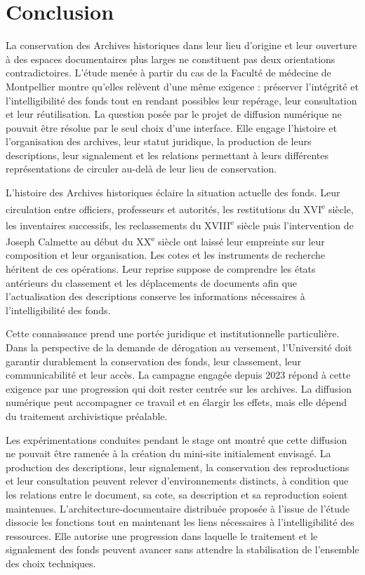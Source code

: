 
\chapter*{Conclusion}

La conservation des Archives historiques dans leur lieu d'origine et leur ouverture à des espaces documentaires plus larges ne constituent pas deux orientations contradictoires. L'étude menée à partir du cas de la Faculté de médecine de Montpellier montre qu'elles relèvent d'une même exigence : préserver l'intégrité et l'intelligibilité des fonds tout en rendant possibles leur repérage, leur consultation et leur réutilisation. La question posée par le projet de diffusion numérique ne pouvait être résolue par le seul choix d'une interface. Elle engage l'histoire et l'organisation des archives, leur statut juridique, la production de leurs descriptions, leur \gls{signalement} et les relations permettant à leurs différentes représentations de circuler au-delà de leur lieu de conservation.

L'histoire des Archives historiques éclaire la situation actuelle des fonds. Leur circulation entre officiers, professeurs et autorités, les restitutions du XVI\textsuperscript{e} siècle, les inventaires successifs, les reclassements du XVIII\textsuperscript{e} siècle puis l'intervention de Joseph Calmette au début du XX\textsuperscript{e} siècle ont laissé leur empreinte sur leur composition et leur organisation. Les cotes et les instruments de recherche héritent de ces opérations. Leur reprise suppose de comprendre les états antérieurs du classement et les déplacements de documents afin que l'actualisation des descriptions conserve les informations nécessaires à l'intelligibilité des fonds.

Cette connaissance prend une portée juridique et institutionnelle particulière. Dans la perspective de la demande de dérogation au versement, l'Université doit garantir durablement la conservation des fonds, leur classement, leur communicabilité et leur accès. La campagne engagée depuis 2023 répond à cette exigence par une progression qui doit rester centrée sur les archives. La diffusion numérique peut accompagner ce travail et en élargir les effets, mais elle dépend du traitement archivistique préalable.

Les expérimentations conduites pendant le stage ont montré que cette diffusion ne pouvait être ramenée à la création du mini-site initialement envisagé. La production des descriptions, leur \gls{signalement}, la conservation des reproductions et leur consultation peuvent relever d'environnements distincts, à condition que les relations entre le document, sa cote, sa description et sa reproduction soient maintenues. L'\gls{architecture-documentaire} distribuée proposée à l'issue de l'étude dissocie les fonctions tout en maintenant les liens nécessaires à l'intelligibilité des ressources. Elle autorise une progression dans laquelle le traitement et le \gls{signalement} des fonds peuvent avancer sans attendre la stabilisation de l'ensemble des choix techniques.

